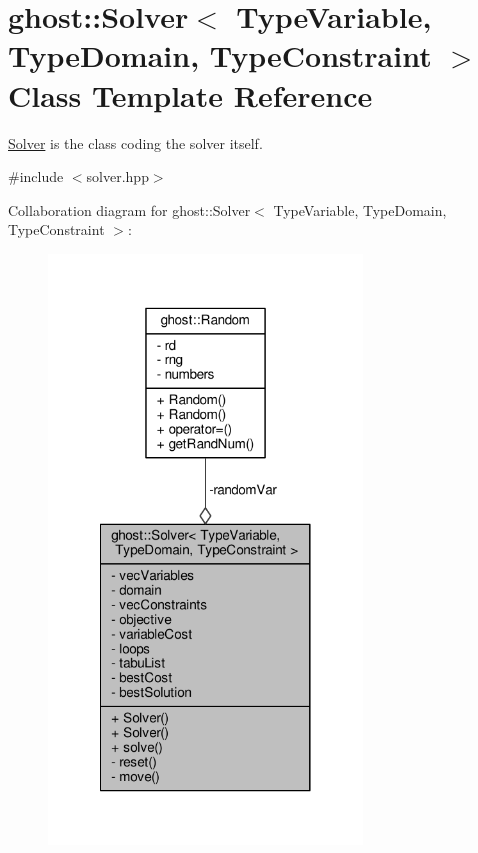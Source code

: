 \hypertarget{classghost_1_1Solver}{\section{ghost\-:\-:Solver$<$ Type\-Variable, Type\-Domain, Type\-Constraint $>$ Class Template Reference}
\label{classghost_1_1Solver}
}


\hyperlink{classghost_1_1Solver}{Solver} is the class coding the solver itself.  




{\ttfamily \#include $<$solver.\-hpp$>$}



Collaboration diagram for ghost\-:\-:Solver$<$ Type\-Variable, Type\-Domain, Type\-Constraint $>$\-:\nopagebreak
\begin{figure}[H]
\begin{center}
\leavevmode
\includegraphics[width=236pt]{classghost_1_1Solver__coll__graph}
\end{center}
\end{figure}
